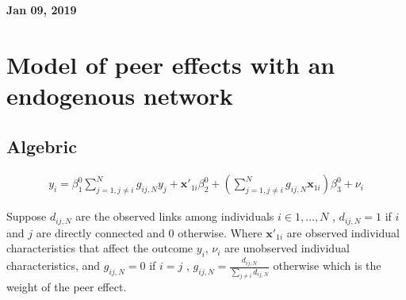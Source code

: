 \documentclass[11pt]{article}
\begin{document}
%

\newcommand{\Ito}{$It\hat{o}$'$s~Lemma$}

\newcommand\ind{\stackrel{\rm ind}{\sim}}
\newcommand\iid{\stackrel{\rm iid}{\sim}}
\renewcommand\c{\mathbf{c}}
\newcommand\y{\mathbf{y}}
\newcommand\z{\mathbf{z}}
\renewcommand\P{\mathbf{P}}
\newcommand\W{\mathbf{W}}
\newcommand\X{\mathbf{X}}
\newcommand\Y{\mathbf{Y}}
\newcommand\Z{\mathbf{Z}}
\newcommand\J{{\cal J}}
\newcommand\B{{\cal B}}
\newcommand\K{{\cal K}}
\newcommand\N{{\rm N}}
\newcommand\bs{\boldsymbol}
\newcommand\bth{\bs\theta}
\newcommand\bbe{\bs\beta}
\renewcommand\*{^\star}

\def\spacingset#1{\renewcommand{\baselinestretch}%
{#1}\small\normalsize} \spacingset{1}



  \bigskip
  \bigskip
  \bigskip
  \begin{center}
    {\LARGE\bf Jan 09, 2019 }
  \end{center}
  \medskip



\spacingset{1.45}



\section{Model of peer effects with an endogenous network} 

\subsection{Algebric} 

  \begin{align}
    y_{i} = \beta_{1}^0 \sum\limits_{j=1, j \neq i}^N g_{ij,N}y_{j} + \mathbf{x'}_{1i}\beta_{2}^0 + 	\left(\sum\limits_{j=1, j \neq i}^N g_{ij,N}\mathbf{x}_{1i} \right) \beta_{3}^0 + \nu_{i}
  \end{align}


 Suppose $d_{ij,N}$ are the observed links among individuals $i \in {1, \dots ,N}$ , $d_{ij,N} = 1$ if $i$ and $j$ are directly connected and 0 otherwise.
Where $\mathbf{x'}_{1i}$ are observed individual characteristics that affect the outcome $y_{i}$, $\nu_{i}$ are unobserved individual characteristics, and
$ g_{ij,N} = 0$ if $i =j$ , $g_{ij,N} = \frac{d_{ij,N}}{\sum\limits_{j \neq i}d_{ij,N}}$ otherwise which is the weight of the peer effect.
\end{document}
